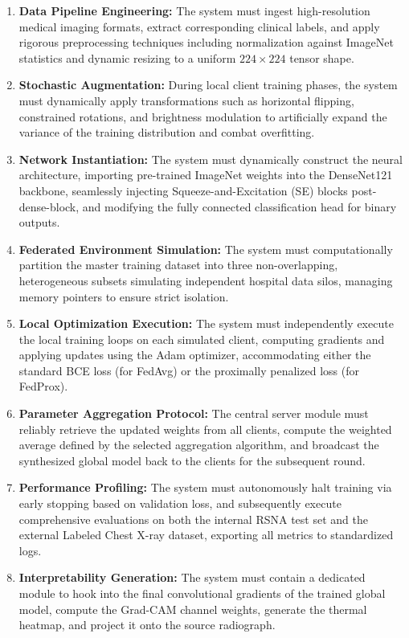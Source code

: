 \documentclass[12pt,a4paper]{report}
\begin{document}
\begin{enumerate}
    \item \textbf{Data Pipeline Engineering:} The system must ingest high-resolution medical imaging formats, extract corresponding clinical labels, and apply rigorous preprocessing techniques including normalization against ImageNet statistics and dynamic resizing to a uniform $224 \times 224$ tensor shape.
    \item \textbf{Stochastic Augmentation:} During local client training phases, the system must dynamically apply transformations such as horizontal flipping, constrained rotations, and brightness modulation to artificially expand the variance of the training distribution and combat overfitting.
    \item \textbf{Network Instantiation:} The system must dynamically construct the neural architecture, importing pre-trained ImageNet weights into the DenseNet121 backbone, seamlessly injecting Squeeze-and-Excitation (SE) blocks post-dense-block, and modifying the fully connected classification head for binary outputs.
    \item \textbf{Federated Environment Simulation:} The system must computationally partition the master training dataset into three non-overlapping, heterogeneous subsets simulating independent hospital data silos, managing memory pointers to ensure strict isolation.
    \item \textbf{Local Optimization Execution:} The system must independently execute the local training loops on each simulated client, computing gradients and applying updates using the Adam optimizer, accommodating either the standard BCE loss (for FedAvg) or the proximally penalized loss (for FedProx).
    \item \textbf{Parameter Aggregation Protocol:} The central server module must reliably retrieve the updated weights from all clients, compute the weighted average defined by the selected aggregation algorithm, and broadcast the synthesized global model back to the clients for the subsequent round.
    \item \textbf{Performance Profiling:} The system must autonomously halt training via early stopping based on validation loss, and subsequently execute comprehensive evaluations on both the internal RSNA test set and the external Labeled Chest X-ray dataset, exporting all metrics to standardized logs.
    \item \textbf{Interpretability Generation:} The system must contain a dedicated module to hook into the final convolutional gradients of the trained global model, compute the Grad-CAM channel weights, generate the thermal heatmap, and project it onto the source radiograph.
\end{enumerate}
\end{document}
